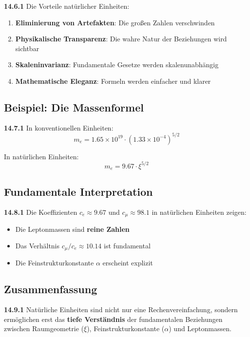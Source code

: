 \documentclass[12pt,a4paper]{article}
\begin{document}
\noindent \textbf{14.6.1} Die Vorteile natürlicher Einheiten:
\begin{enumerate}
	\item \textbf{Eliminierung von Artefakten}: Die großen Zahlen verschwinden
	\item \textbf{Physikalische Transparenz}: Die wahre Natur der Beziehungen wird sichtbar
	\item \textbf{Skaleninvarianz}: Fundamentale Gesetze werden skalenunabhängig
	\item \textbf{Mathematische Eleganz}: Formeln werden einfacher und klarer
\end{enumerate}

\subsection{Beispiel: Die Massenformel}

\noindent \textbf{14.7.1} In konventionellen Einheiten:
\[
m_e = 1.65 \times 10^{19} \cdot (1.33 \times 10^{-4})^{5/2}
\]

In natürlichen Einheiten:
\[
m_e = 9.67 \cdot \xi^{5/2}
\]

\subsection{Fundamentale Interpretation}

\noindent \textbf{14.8.1} Die Koeffizienten $c_e \approx 9.67$ und $c_\mu \approx 98.1$ in natürlichen Einheiten zeigen:

\begin{itemize}
	\item Die Leptonmassen sind \textbf{reine Zahlen}
	\item Das Verhältnis $c_\mu/c_e \approx 10.14$ ist fundamental
	\item Die Feinstrukturkonstante $\alpha$ erscheint explizit
\end{itemize}

\subsection{Zusammenfassung}

\noindent \textbf{14.9.1} Natürliche Einheiten sind nicht nur eine Rechenvereinfachung, sondern ermöglichen erst das \textbf{tiefe Verständnis} der fundamentalen Beziehungen zwischen Raumgeometrie ($\xi$), Feinstrukturkonstante ($\alpha$) und Leptonmassen.

\end{document}
